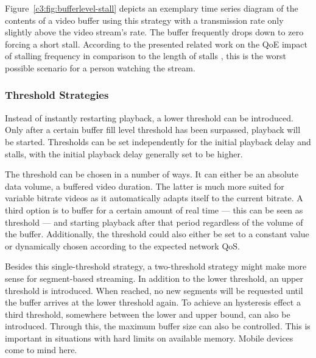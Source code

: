 Figure~\ref{c3:fig:bufferlevel-stall} depicts an exemplary time series diagram of the contents of a video buffer using this strategy with a transmission rate only slightly above the video stream's rate. The buffer frequently drops down to zero forcing a short stall. According to the presented related work on the \gls{QoE} impact of stalling frequency in comparison to the length of stalls \cite{6123395}, this is the worst possible scenario for a person watching the stream.


\subsubsection{Threshold Strategies}

Instead of instantly restarting playback, a lower threshold can be introduced. Only after a certain buffer fill level threshold has been surpassed, playback will be started. Thresholds can be set independently for the initial playback delay and stalls, with the initial playback delay generally set to be higher.

The threshold can be chosen in a number of ways. It can either be an absolute data volume, a buffered video duration. The latter is much more suited for variable bitrate videos as it automatically adapts itself to the current bitrate. A third option is to buffer for a certain amount of real time --- this can be seen as threshold --- and starting playback after that period regardless of the volume of the buffer. Additionally, the threshold could also either be set to a constant value or dynamically chosen according to the expected network \gls{QoS}.

Besides this single-threshold strategy, a two-threshold strategy might make more sense for segment-based streaming. In addition to the lower threshold, an upper threshold is introduced. When reached, no new segments will be requested until the buffer arrives at the lower threshold again.  To achieve an hysteresis effect a third threshold, somewhere between the lower and upper bound, can also be introduced. Through this, the maximum buffer size can also be controlled. This is important in situations with hard limits on available memory. Mobile devices come to mind here.

